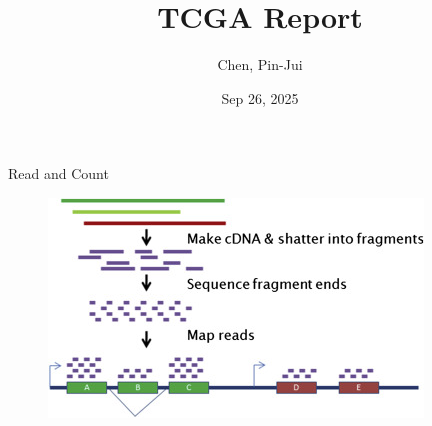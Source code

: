 \documentclass[12pt, aspectratio=43]{beamer}
\title[\textbf{TCGA Report}]{TCGA Report}
\author[Chen, Pin-Jui]{Chen, Pin-Jui}
\date[Sep 26, 2025]{Sep 26, 2025}
\begin{document}
	
	\begin{frame}
		\titlepage
	\end{frame}
	
	\begin{frame}{Read and Count}
		\begin{figure}[h!]
			\centering
			\includegraphics[width=\linewidth]{Read.jpg}
		\end{figure}
	\end{frame}
	
	
\end{document}
